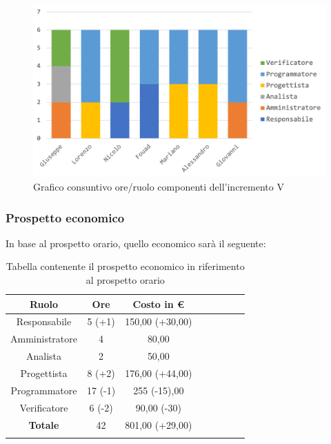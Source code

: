			\begin{figure}[H]
				\centering
				\includegraphics[width=0.8\linewidth]{images/consuntivo/ConsIncr5-1.png}
				\caption{Grafico consuntivo ore/ruolo componenti dell'incremento V}
				\label{fig:consuntivo grafico suddivisione ruoli incremento V}
			\end{figure}
			\pagebreak
			
		\subsubsection{Prospetto economico}
			In base al prospetto orario, quello economico sarà il seguente: 
			
			\begin{longtable}{|c|c|c|c|c|c|c|c}
				\hline
				\rowcolor{lighter-grayer}
				\textbf{Ruolo} & \textbf{Ore} & \textbf{Costo in €} \\
				\hline
				\endfirsthead
				\hline
			Responsabile 	    & 5 (+1) & 150,00 (+30,00)\\
			\hline 
			\hline
			Amministratore	  & 4 & 80,00\\
			\hline
			\hline
			Analista 				& 2 & 50,00\\
			\hline
			\hline
			Progettista 		  & 8 (+2) & 176,00 (+44,00)\\
			\hline
			\hline
			Programmatore 	 & 17 (-1)  & 255 (-15),00 \\
			\hline
			\hline
			Verificatore 		  & 6 (-2) & 90,00 (-30)\\
			\hline
			\textbf{Totale} 	&  42 & 801,00 (+29,00)\\
			\hline
				
				\caption{Tabella contenente il prospetto economico in riferimento al prospetto orario}
			\end{longtable}
			
